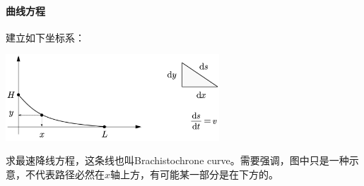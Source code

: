 \paragraph*{曲线方程}
\begin{example}
建立如下坐标系：
\begin{center}
\includegraphics[width=8cm]{figure/fastest-path.png}
\end{center}
求最速降线方程，这条线也叫Brachistochrone curve。需要强调，图中只是一种示意，不代表路径必然在$x$轴上方，有可能某一部分是在下方的。
\end{example}
